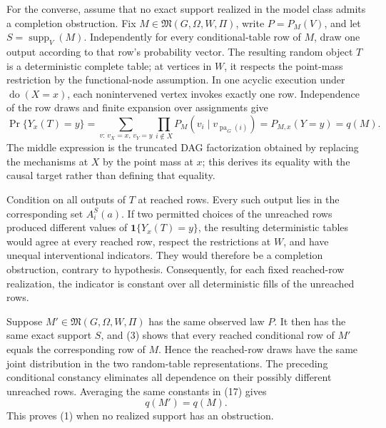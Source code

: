 For the converse, assume that no exact support realized in the model class admits a completion obstruction.  Fix \(M\in\mathfrak M(G,\Omega,W,\Pi)\), write \(P=P_M(V)\), and let \(S=\operatorname{supp}_V(M)\).  Independently for every conditional-table row of \(M\), draw one output according to that row's probability vector.  The resulting random object \(T\) is a deterministic complete table; at vertices in \(W\), it respects the point-mass restriction by the functional-node assumption.  In one acyclic execution under \(\operatorname{do}(X=x)\), each nonintervened vertex invokes exactly one row.  Independence of the row draws and finite expansion over assignments give
\[
 \Pr\{Y_x(T)=y\}
 =\sum_{v:\,v_X=x,\,v_Y=y}
 \prod_{i\notin X}P_M(v_i\mid v_{\operatorname{pa}_G(i)})
 =P_{M,x}(Y=y)=q(M).
 \tag{17}
\]
The middle expression is the truncated DAG factorization obtained by replacing the mechanisms at \(X\) by the point mass at \(x\); this derives its equality with the causal target rather than defining that equality.

Condition on all outputs of \(T\) at reached rows.  Every such output lies in the corresponding set \(A_i^S(a)\).  If two permitted choices of the unreached rows produced different values of \(\mathbf 1\{Y_x(T)=y\}\), the resulting deterministic tables would agree at every reached row, respect the restrictions at \(W\), and have unequal interventional indicators.  They would therefore be a completion obstruction, contrary to hypothesis.  Consequently, for each fixed reached-row realization, the indicator is constant over all deterministic fills of the unreached rows.

Suppose \(M'\in\mathfrak M(G,\Omega,W,\Pi)\) has the same observed law \(P\).  It then has the same exact support \(S\), and (3) shows that every reached conditional row of \(M'\) equals the corresponding row of \(M\).  Hence the reached-row draws have the same joint distribution in the two random-table representations.  The preceding conditional constancy eliminates all dependence on their possibly different unreached rows.  Averaging the same constants in (17) gives
\[
 q(M')=q(M).
 \tag{18}
\]
This proves (1) when no realized support has an obstruction.

